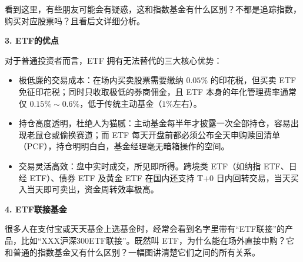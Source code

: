 \documentclass[12pt,openany]{book}
\newcommand{\subhead}[1]{%
    \par\vspace{0.5\baselineskip}%
    \noindent\textbf{#1}\par%
    \vspace{0.5\baselineskip}%
}
\begin{document}
看到这里，有些朋友可能会有疑惑，这和指数基金有什么区别？不都是追踪指数，购买对应股票吗？且看后文详细分析。

\subhead{3. ETF的优点}

对于普通投资者而言，ETF 拥有无法替代的三大核心优势：
\begin{itemize}
    \item 极低廉的交易成本：在场内买卖股票需要缴纳 $0.05\%$ 的印花税，但买卖 ETF 免征印花税；同时只收取极低的券商佣金，且 ETF 本身的年化管理费率通常仅 $0.15\%\sim 0.6\%$，低于传统主动基金（$1\%$左右）。
    \item 持仓高度透明，杜绝人为猫腻：主动基金每半年才披露一次全部持仓，容易出现老鼠仓或偷换赛道；而 ETF 每天开盘前都必须公布全天申购赎回清单（PCF），持仓明明白白，基金经理毫无暗箱操作的空间。
    \item 交易灵活高效：盘中实时成交，所见即所得。跨境类 ETF（如纳指 ETF、日经 ETF）、债券 ETF 及黄金 ETF 在国内还支持 T+0 日内回转交易，当天买入当天即可卖出，资金周转效率极高。
\end{itemize}

\subhead{4. ETF联接基金}

很多人在支付宝或天天基金上选基金时，经常会看到名字里带有“ETF联接”的产品，比如“XXX沪深300ETF联接”。既然叫 ETF，为什么能在场外直接申购？它和普通的指数基金又有什么区别？一幅图讲清楚它们之间的所有关系。
\end{document}
